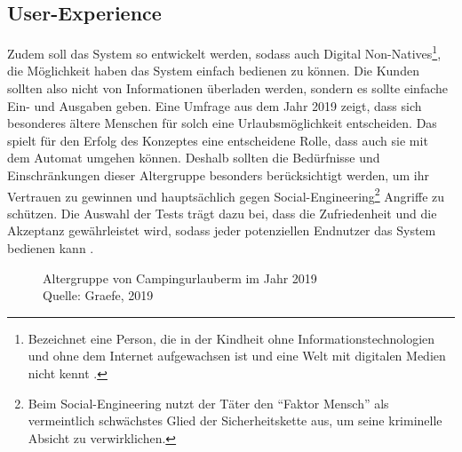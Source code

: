 \subsection{User-Experience}
Zudem soll das System so entwickelt werden, sodass auch Digital Non-Natives\footnote{Bezeichnet
eine Person, die in der Kindheit ohne Informationstechnologien und ohne dem Internet aufgewachsen ist 
und eine Welt mit digitalen Medien nicht kennt \cite{misc:MSND}.}, die Möglichkeit \cite{refart:QWDN} haben
das System einfach bedienen zu können. Die Kunden sollten also nicht von Informationen überladen werden, 
sondern es sollte einfache Ein- und Ausgaben geben. Eine Umfrage aus dem Jahr 2019 \cite{periodical:AdCJ}
zeigt, dass sich besonderes ältere Menschen \cite{periodical:AdCJ} für solch eine Urlaubsmöglichkeit entscheiden.
Das spielt für den Erfolg des Konzeptes eine entscheidene Rolle, dass auch sie mit dem Automat umgehen können. 
Deshalb sollten die Bedürfnisse und Einschränkungen dieser Altergruppe besonders berücksichtigt werden, um ihr 
Vertrauen zu gewinnen \cite{refart:HLAU} und hauptsächlich gegen Social-Engineering\footnote{Beim Social-Engineering 
nutzt der Täter den ``Faktor Mensch'' als vermeintlich schwächstes Glied der Sicherheitskette aus, um seine kriminelle
Absicht zu verwirklichen.\cite{booklet:BSSE}} Angriffe zu schützen. Die Auswahl der Tests trägt dazu bei, dass die 
Zufriedenheit und die Akzeptanz gewährleistet wird, sodass jeder potenziellen Endnutzer das System bedienen kann 
\cite{refbook:IASE}.


\vfill
\begin{figure}[H]
    \caption{Altergruppe von Campingurlauberm im Jahr 2019 \\ Quelle: Graefe, 2019}
    \label{fig:periodical_AdCJ}
\end{figure}


